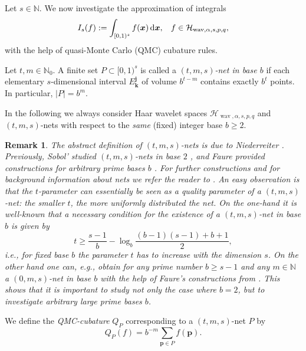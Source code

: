 \documentclass[12pt]{article}
\DeclareMathOperator{\wav}{wav}
\newtheorem{definition}{Definition}
\newtheorem{remark}{Remark}
\newcommand{\bsk}{\boldsymbol{k}}
\newcommand{\bsj}{\boldsymbol{j}}
\newcommand{\bsx}{\boldsymbol{x}}
\newcommand{\bsp}{\boldsymbol{p}}
\newcommand{\HH}{\mathcal{H}}
\newcommand{\N}{\mathbb{N}}
\begin{document}
Let $s\in \N$. We now investigate the approximation of integrals 
\begin{equation*}
I_s(f) := \int_{[0,1)^s} f(\bsx) \, {\rm d}\bsx,
\hspace{2ex}f\in \HH_{\wav, \alpha, s, p,q},
\end{equation*}
with the help of quasi-Monte Carlo (QMC) cubature rules.

Let $t,m \in \N_0$. A finite set $P\subset [0,1)^s$ is called a \emph{$(t,m,s)$-net in base $b$} if each elementary $s$-dimensional interval $E^{\bsj}_{\bsk}$ of volume $b^{t-m}$ contains exactly $b^t$
points. In particular, $|P| = b^m$. 

In the following %
we always consider Haar wavelet spaces $\HH_{\wav, \alpha, s, p,q}$ and $(t,m,s)$-nets with respect to the \emph{same} (fixed) integer base $b \ge 2$.

\begin{remark}
The abstract definition of $(t,m,s)$-nets 
is due to Niederreiter \cite{Nie87}. Previously, Sobol' studied $(t,m,s)$-nets in base $2$ \cite{Sob67}, and Faure provided constructions for arbitrary prime bases $b$ \cite{Fau82}. For further constructions and for background information about nets we refer the reader to \cite{Nie92, DP10}. 
An easy observation is that the $t$-parameter can essentially be seen as a quality parameter of a $(t,m,s)$-net: the smaller $t$, the more uniformly distributed the net. On the one-hand it is well-known that a necessary condition for the existence of a $(t,m,s)$-net in base $b$ is given by
\[
t \ge \frac{s-1}{b} - \log_b \frac{(b-1)(s-1) + b+ 1}{2},
\]
i.e., for fixed base $b$ the parameter $t$ has to increase with the dimension $s$.
On the other hand one can, e.g., obtain  for any prime number $b\ge s-1$ and any $m\in \N$ a $(0,m,s)$-net in base $b$ with the help of Faure's constructions from \cite{Fau82}. 
This shows that it is important to study not only the case where $b=2$, but to investigate arbitrary large prime bases $b$.
\end{remark}

We define the \emph{QMC-cubature } $Q_{P}$ corresponding to a $(t,m,s)$-net $P$
by
\begin{equation}
\label{qmc-alg}
Q_{P}(f) = b^{-m} \sum_{\bsp\in P} f(\bsp).
\end{equation}
\end{document}
